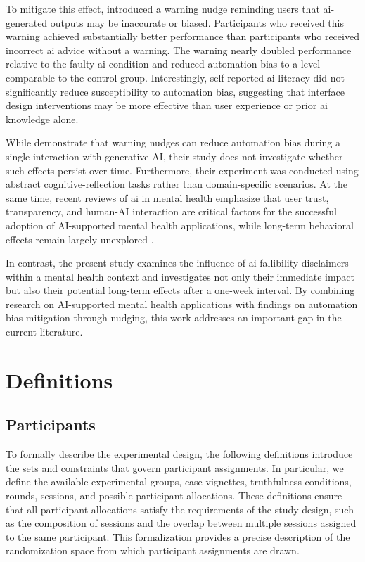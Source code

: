 \documentclass[sigconf,natbib=false]{acmart}
\begin{document}
To mitigate this effect, \citeauthor[]{wingerter_mitigating_2025} introduced a warning nudge reminding users that \gls{ai}-generated outputs may be inaccurate or biased.
Participants who received this warning achieved substantially better performance than participants who received incorrect \gls{ai} advice without a warning.
The warning nearly doubled performance relative to the faulty-\gls{ai} condition and reduced automation bias to a level comparable to the control group.
Interestingly, self-reported \Gls{ai} literacy did not significantly reduce susceptibility to automation bias, suggesting that interface design interventions may be more effective than user experience or prior \Gls{ai} knowledge alone.


While \citeauthor[]{wingerter_mitigating_2025} demonstrate that warning nudges can reduce automation bias during a single interaction with generative AI, their study does not investigate whether such effects persist over time.
Furthermore, their experiment was conducted using abstract cognitive-reflection tasks rather than domain-specific scenarios.
\autocite[]{wingerter_mitigating_2025}
At the same time, recent reviews of \Gls{ai} in mental health emphasize that user trust, transparency, and human-AI interaction are critical factors for the successful adoption of AI-supported mental health applications, while long-term behavioral effects remain largely unexplored \autocite[]{mikaeili_reimagining_2025}.

In contrast, the present study examines the influence of \gls{ai} fallibility disclaimers within a mental health context and investigates not only their immediate impact but also their potential long-term effects after a one-week interval.
By combining research on AI-supported mental health applications with findings on automation bias mitigation through nudging, this work addresses an important gap in the current literature.



\section{Definitions}

\subsection{Participants}
\label{sec:participants}

To formally describe the experimental design, the following definitions introduce the sets and constraints that govern participant assignments.
In particular, we define the available experimental groups, case vignettes, truthfulness conditions, rounds, sessions, and possible participant allocations.
These definitions ensure that all participant allocations satisfy the requirements of the study design, such as the composition of sessions and the overlap between multiple sessions assigned to the same participant.
This formalization provides a precise description of the randomization space from which participant assignments are drawn.
\end{document}
